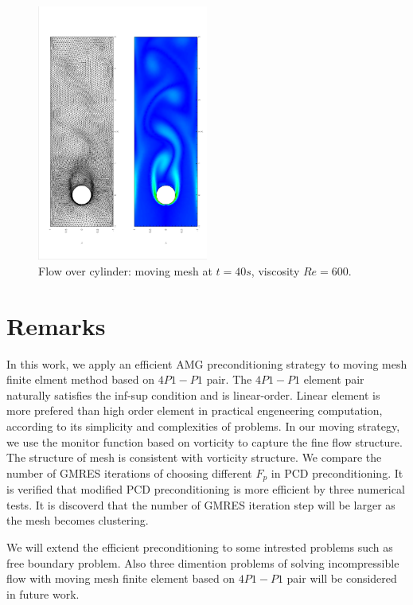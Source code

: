 \documentclass{eajam}
\begin{document}
      \begin{figure}[!htbp]
        \centering
        \includegraphics[width = 0.5\textwidth, angle = -90]{picture/obstacle_flow_data/mesh_vortex_t40s.eps}
        \caption{\small Flow over cylinder: moving mesh at $t = 40s$,
          viscosity $Re = 600$.}
        \label{fig::cylinder_mesh_40s}
      \end{figure}


\section{Remarks}
   \label{sec6} In this work, we apply an efficient AMG
   preconditioning strategy to moving mesh finite elment method based
   on $4P1-P1$ pair. The $4P1-P1$ element pair naturally satisfies the
   inf-sup condition and is linear-order. 
   Linear element is more prefered than high order element in
   practical engeneering computation, according to its simplicity and
   complexities of problems. In our moving strategy, we use the
   monitor function based on vorticity to capture the fine flow
   structure. The structure of mesh is consistent with vorticity
   structure. We compare the number of GMRES iterations of choosing
   different $F_p$ in PCD preconditioning. It is verified that
   modified PCD preconditioning is more efficient by three numerical
   tests. It is discoverd that the number of GMRES iteration step will
   be larger as the mesh becomes clustering. 
   
   We will extend the efficient preconditioning to some intrested 
   problems such as free boundary problem. Also three dimention
   problems of solving incompressible flow with moving mesh finite
   element based on $4P1-P1$ pair will be considered in future work. 
\end{document}
